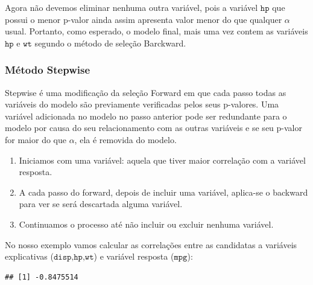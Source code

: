 \documentclass[
]{book}
\newenvironment{Shaded}{\begin{snugshade}}{\end{snugshade}}
\newcommand{\FunctionTok}[1]{\textcolor[rgb]{0.00,0.00,0.00}{#1}}
\newcommand{\NormalTok}[1]{#1}
\newcommand{\SpecialCharTok}[1]{\textcolor[rgb]{0.00,0.00,0.00}{#1}}
\providecommand{\tightlist}{%
  \setlength{\itemsep}{0pt}\setlength{\parskip}{0pt}}
\begin{document}
Agora não devemos eliminar nenhuma outra variável, pois a variável \(\texttt{hp}\) que possui o menor p-valor ainda assim apresenta valor menor do que qualquer \(\alpha\) usual. Portanto, como esperado, o modelo final, mais uma vez contem as variáveis \(\texttt{hp}\) e \(\texttt{wt}\) segundo o método de seleção Barckward.

\hypertarget{muxe9todo-stepwise}{%
\subsubsection{Método Stepwise}\label{muxe9todo-stepwise}}

Stepwise é uma modificação da seleção Forward em que cada passo todas as variáveis do modelo são previamente verificadas pelos seus p-valores. Uma variável adicionada no modelo no passo anterior pode ser redundante para o modelo por causa do seu relacionamento com as outras variáveis e se seu p-valor for maior do que \(\alpha\), ela é removida do modelo.

\begin{enumerate}
\def\labelenumi{\arabic{enumi}.}
\tightlist
\item
  Iniciamos com uma variável: aquela que tiver maior correlação com a variável resposta.
\item
  A cada passo do forward, depois de incluir uma variável, aplica-se o backward para ver se será descartada alguma variável.
\item
  Continuamos o processo até não incluir ou excluir nenhuma variável.
\end{enumerate}

No nosso exemplo vamos calcular as correlações entre as candidatas a variáveis explicativas (\(\texttt{disp,hp,wt}\)) e variável resposta (\(\texttt{mpg}\)):

\begin{Shaded}
\end{Shaded}

\begin{verbatim}
## [1] -0.8475514
\end{verbatim}

\begin{Shaded}
\end{Shaded}
\end{document}
